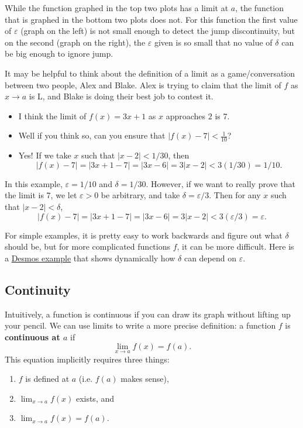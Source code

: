 While the function graphed in the top two plots has a limit at $a$, the function that is graphed in the bottom two plots does not. For this function the first value of $\varepsilon$ (graph on the left) is not small enough to detect the jump discontinuity, but on the second (graph on the right), the $\varepsilon$ given is so small that no value of $\delta$ can be big enough to ignore jump.

It may be helpful to think about the definition of a limit as a game/conversation between two people, Alex and Blake. Alex is trying to claim that the limit of $f$ as $x\to a$ is L, and Blake is doing their best job to contest it.
\begin{exampleblock}
\begin{itemize}
\item[A:] I think the limit of $f(x)=3x+1$ as $x$ approaches $2$ is 7.
\item[B:] Well if you think so, can you ensure that $|f(x)-7|<\frac{1}{10}$?
\item[A:] Yes! If we take $x$ such that $|x-2|<1/30$, then
$$|f(x)-7|=|3x + 1 - 7| = |3x-6| = 3|x-2| < 3(1/30) = 1/10.$$
\end{itemize}
In this example, $\varepsilon = 1/10$ and $\delta = 1/30$. However, if we want to really prove that the limit is 7, we let $\varepsilon>0$ be arbitrary, and take $\delta = \varepsilon/3$. Then for any $x$ such that $|x-2|<\delta$,
$$|f(x)-7|=|3x + 1 - 7| = |3x-6| = 3|x-2| < 3(\varepsilon/3) = \varepsilon.$$
\end{exampleblock}


For simple examples, it is pretty easy to work backwards and figure out what $\delta$ should be, but for more complicated functions $f$, it can be more difficult. Here is a \href{https://www.desmos.com/calculator/cuoca85inx}{Desmos example} that shows dynamically how $\delta$ can depend on $\varepsilon$.


\subsection{Continuity}

Intuitively, a function is continuous if you can draw its graph without lifting up your pencil. We can use limits to write a more precise definition: a function $f$ is \textbf{continuous at $a$} if
$$\lim_{x\to a}f(x)=f(a).$$
This equation implicitly requires three things:
\begin{enumerate}
\item[(a)] $f$ is defined at $a$ (i.e. $f(a)$ makes sense),
\item[(b)] $\displaystyle\lim_{x\to a}f(x)$ exists, and
\item[(c)] $\displaystyle\lim_{x\to a}f(x)=f(a)$.
\end{enumerate}

